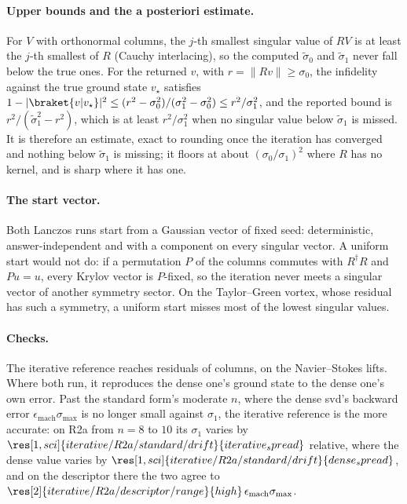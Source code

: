 \paragraph{Upper bounds and the a posteriori estimate.} For $V$ with orthonormal columns, the $j$-th smallest singular value of $RV$ is at least the $j$-th smallest of $R$ (Cauchy interlacing), so the computed $\tilde\sigma_0$ and $\tilde\sigma_1$ never fall below the true ones. For the returned $v$, with $r=\|Rv\|\ge\sigma_0$, the infidelity against the true ground state $v_\star$ satisfies $1-|\braket{v|v_\star}|^2\le(r^2-\sigma_0^2)/(\sigma_1^2-\sigma_0^2)\le r^2/\sigma_1^2$, and the reported bound is $r^2/(\tilde\sigma_1^2-r^2)$, which is at least $r^2/\sigma_1^2$ when no singular value below $\tilde\sigma_1$ is missed. It is therefore an estimate, exact to rounding once the iteration has converged and nothing below $\tilde\sigma_1$ is missing; it floors at about $(\sigma_0/\sigma_1)^2$ where $R$ has no kernel, and is sharp where it has one.

\paragraph{The start vector.} Both Lanczos runs start from a Gaussian vector of fixed seed: deterministic, answer-independent and with a component on every singular vector. A uniform start would not do: if a permutation $P$ of the columns commutes with $R^\dagger R$ and $Pu=u$, every Krylov vector is $P$-fixed, so the iteration never meets a singular vector of another symmetry sector. On the Taylor--Green vortex, whose residual has such a symmetry, a uniform start misses most of the lowest singular values.

\paragraph{Checks.} The iterative reference reaches residuals of  columns, on the Navier--Stokes lifts. Where both run, it reproduces the dense one's ground state to the dense one's own error. Past the standard form's moderate $n$, where the dense \gls{svd}'s backward error $\epsilon_{\mathrm{mach}}\sigma_{\max}$ is no longer small against $\sigma_1$, the iterative reference is the more accurate: on R2a from $n=8$ to $10$ its $\sigma_1$ varies by $\res[1,sci]{iterative/R2a/standard/drift}{iterative_spread}$ relative, where the dense value varies by $\res[1,sci]{iterative/R2a/standard/drift}{dense_spread}$, and on the descriptor there the two agree to $\res[2]{iterative/R2a/descriptor/range}{high}\,\epsilon_{\mathrm{mach}}\sigma_{\max}$.

